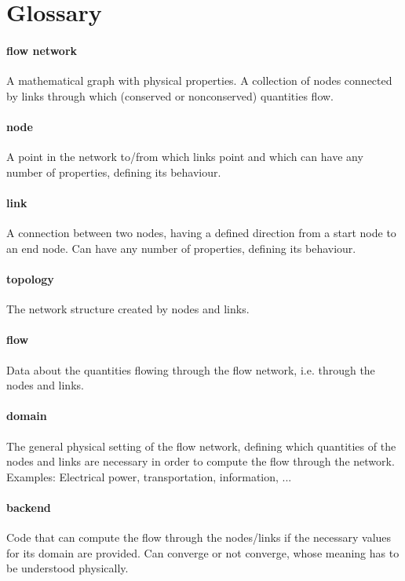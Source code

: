 \documentclass[11pt,fleqn]{book} %
\begin{document}
\section{Glossary}
\paragraph{flow network}
A mathematical graph with physical properties. A collection of nodes connected by links through which (conserved or nonconserved) quantities flow.

\paragraph{node}
A point in the network to/from which links point and which can have any number of properties, defining its behaviour.

\paragraph{link}
A connection between two nodes, having a defined direction from a start node to an end node. Can have any number of properties, defining its behaviour.

\paragraph{topology}
The network structure created by nodes and links.

\paragraph{flow}
Data about the quantities flowing through the flow network, i.e. through the nodes and links.

\paragraph{domain}
The general physical setting of the flow network, defining which quantities of the nodes and links are necessary in order to compute the flow through the network. Examples: Electrical power, transportation, information, ...

\paragraph{backend}
Code that can compute the flow through the nodes/links if the necessary values for its domain are provided. Can converge or not converge, whose meaning has to be understood physically.
\end{document}
